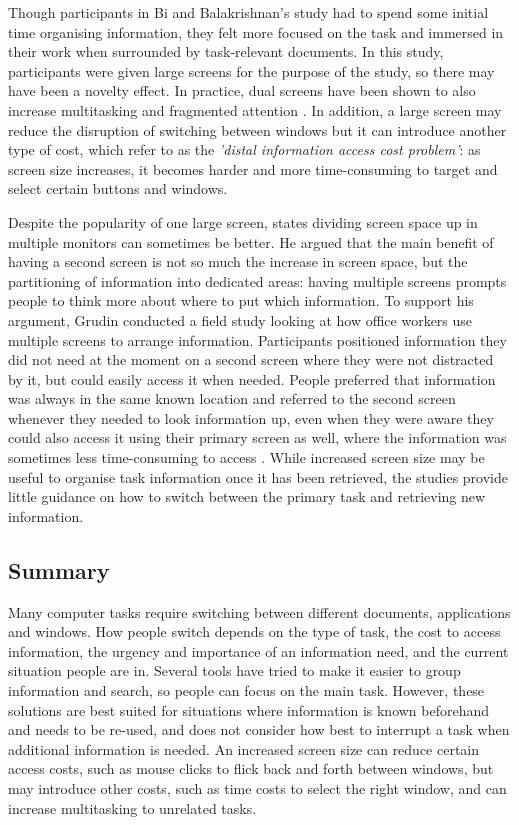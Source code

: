 Though participants in Bi and Balakrishnan's study had to spend some initial time organising information, they felt more focused on the task and immersed in their work when surrounded by task-relevant documents. In this study, participants were given large screens for the purpose of the study, so there may have been a novelty effect. In practice, dual screens have been shown to also increase multitasking and fragmented attention \citep{Robertson2005}. In addition, a large screen may reduce the disruption of switching between windows but it can introduce another type of cost, which \citet{Robertson2005} refer to as the \textit{'distal information access cost problem'}: as screen size increases, it becomes harder and more time-consuming to target and select certain buttons and windows. 

Despite the popularity of one large screen, \citet{Grudin2001} states dividing screen space up in multiple monitors can sometimes be better. He argued that the main benefit of having a second screen is not so much the increase in screen space, but the partitioning of information into dedicated areas: having multiple screens prompts people to think more about where to put which information. To support his argument, Grudin conducted a field study looking at how office workers use multiple screens to arrange information. Participants positioned information they did not need at the moment on a second screen where they were not distracted by it, but could easily access it when needed. People preferred that information was always in the same known location and referred to the second screen whenever they needed to look information up, even when they were aware they could also access it using their primary screen as well, where the information was sometimes less time-consuming to access \citep{Grudin2001}. While increased screen size may be useful to organise task information once it has been retrieved, the studies provide little guidance on how to switch between the primary task and retrieving new information. 

\subsection{Summary}
Many computer tasks require switching between different documents, applications and windows. How people switch depends on the type of task, the cost to access information, the urgency and importance of an information need, and the current situation people are in. Several tools have tried to make it easier to group information and search, so people can focus on the main task. However, these solutions are best suited for situations where information is known beforehand and needs to be re-used, and does not consider how best to interrupt a task when additional information is needed. An increased screen size can reduce certain access costs, such as mouse clicks to flick back and forth between windows, but may introduce other  costs, such as time costs to select the right window, and can increase multitasking to unrelated tasks.

